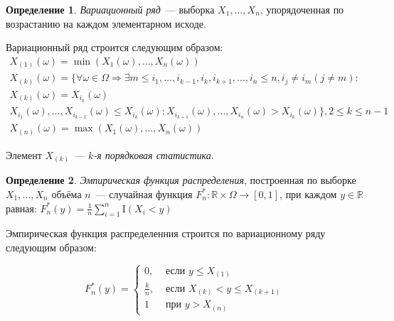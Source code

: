 \documentclass[oneside,final,14pt]{extreport}
\theoremstyle{definition}
\newtheorem{defn}{Определение}[section]
\begin{document}
\begin{defn}
{\it Вариационный ряд}~--- выборка $X_{1}, \ldots, X_{n}$, упорядоченная по возрастанию на каждом элементарном исходе.
\end{defn}
Вариационный ряд строится следующим образом:
\begin{gather*}
    X_{(1)}(\omega)=\min (X_{1}(\omega), \ldots, X_{n}(\omega)) \\
    X_{(k)}(\omega)=\{\forall \omega \in \Omega \Rightarrow \exists m \leq i_{1}, \ldots, i_{k-1}, i_{k}, i_{k+1}, \ldots, i_{n} \leq n, i_{j} \neq i_{m}(j \neq m): \\ 
    X_{(k)}(\omega)=X_{i_{k}}(\omega) \\
    X_{i_{1}}(\omega), \ldots, X_{i_{k-1}}(\omega) \leq X_{i_{k}}(\omega); X_{i_{k+1}}(\omega), \ldots, X_{i_{n}}(\omega)>X_{i_{k}}(\omega)\}, 2 \leq k \leq n-1 \\
    X_{(n)}(\omega)=\max (X_{1}(\omega), \ldots, X_{n}(\omega))
\end{gather*}

Элемент $X_{(k)}$~--- {\it $k$-я порядковая статистика}.

\begin{defn}
{\it Эмпирическая функция распределения}, построенная по выборке $X_{1}, \ldots, X_{n}$ объёма $n$~--- случайная функция $F_{n}^{*}: \mathbb{R} \times \Omega \rightarrow[0,1]$, при каждом $y \in \mathbb{R}$ равная:
$F_{n}^{*}(y) =\frac{1}{n} \sum_{i=1}^{n} \mathrm{I}\left(X_{i}<y\right)$
\end{defn}

Эмпирическая функция распределенния строится по вариационному ряду следующим образом:

\begin{equation*}
    F_{n}^{*}(y)=\left\{\begin{array}{ll}
    0, & \text { если } y \leqslant X_{(1)} \\
    \frac{k}{n}, & \text { если } X_{(k)}<y \leqslant X_{(k+1)} \\
    1 & \text { при } y>X_{(n)}
    \end{array}\right.
\end{equation*}
\end{document}
